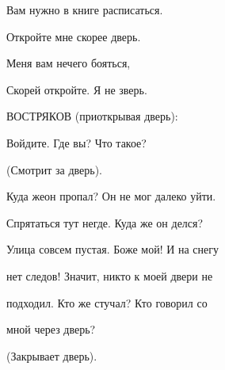 Вам нужно в книге расписаться.

Откройте мне скорее дверь.

Меня вам нечего бояться,

Скорей откройте. Я не зверь.

\begin{flushleft}ВОСТРЯКОВ (приоткрывая дверь):\end{flushleft}

Войдите. Где вы? Что такое?

\begin{center}(Смотрит за дверь).\end{center}

Куда жеон пропал? Он не мог далеко уйти.

Спрятаться  тут негде. Куда же он делся?

Улица совсем пустая. Боже мой! И на снегу
   
нет следов! Значит, никто к моей двери не

подходил. Кто же стучал? Кто говорил со

мной через дверь?

\begin{center}(Закрывает дверь).\end{center}

\begin{flushright}[1937 - 1938 гг.]\end{flushright}